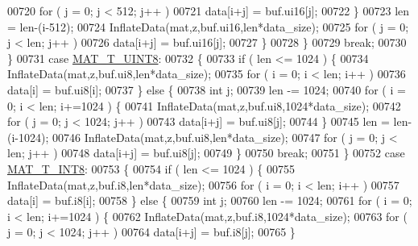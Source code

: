 \begin{DoxyCode}
00720                         \textcolor{keywordflow}{for} ( j = 0; j < 512; j++ )
00721                             data[i+j] = buf.ui16[j];
00722                     \}
00723                     len = len-(i-512);
00724                     InflateData(mat,z,buf.ui16,len*data\_size);
00725                     \textcolor{keywordflow}{for} ( j = 0; j < len; j++ )
00726                         data[i+j] = buf.ui16[j];
00727                 \}
00728             \}
00729             \textcolor{keywordflow}{break};
00730         \}
00731         \textcolor{keywordflow}{case} \hyperlink{group___m_a_t_ggacf7b3b879282b7ab3a51190e49bf3453a01c1bd7db68f90552862eb5d311be408}{MAT\_T\_UINT8}:
00732         \{
00733             \textcolor{keywordflow}{if} ( len <= 1024 ) \{
00734                 InflateData(mat,z,buf.ui8,len*data\_size);
00735                 \textcolor{keywordflow}{for} ( i = 0; i < len; i++ )
00736                     data[i] = buf.ui8[i];
00737             \} \textcolor{keywordflow}{else} \{
00738                 \textcolor{keywordtype}{int} j;
00739                 len -= 1024;
00740                 \textcolor{keywordflow}{for} ( i = 0; i < len; i+=1024 ) \{
00741                     InflateData(mat,z,buf.ui8,1024*data\_size);
00742                     \textcolor{keywordflow}{for} ( j = 0; j < 1024; j++ )
00743                         data[i+j] = buf.ui8[j];
00744                 \}
00745                 len = len-(i-1024);
00746                 InflateData(mat,z,buf.ui8,len*data\_size);
00747                 \textcolor{keywordflow}{for} ( j = 0; j < len; j++ )
00748                     data[i+j] = buf.ui8[j];
00749             \}
00750             \textcolor{keywordflow}{break};
00751         \}
00752         \textcolor{keywordflow}{case} \hyperlink{group___m_a_t_ggacf7b3b879282b7ab3a51190e49bf3453a9807f5033ed4f9b548953742d9fd1658}{MAT\_T\_INT8}:
00753         \{
00754             \textcolor{keywordflow}{if} ( len <= 1024 ) \{
00755                 InflateData(mat,z,buf.i8,len*data\_size);
00756                 \textcolor{keywordflow}{for} ( i = 0; i < len; i++ )
00757                     data[i] = buf.i8[i];
00758             \} \textcolor{keywordflow}{else} \{
00759                 \textcolor{keywordtype}{int} j;
00760                 len -= 1024;
00761                 \textcolor{keywordflow}{for} ( i = 0; i < len; i+=1024 ) \{
00762                     InflateData(mat,z,buf.i8,1024*data\_size);
00763                     \textcolor{keywordflow}{for} ( j = 0; j < 1024; j++ )
00764                         data[i+j] = buf.i8[j];
00765                 \}

\end{DoxyCode}
